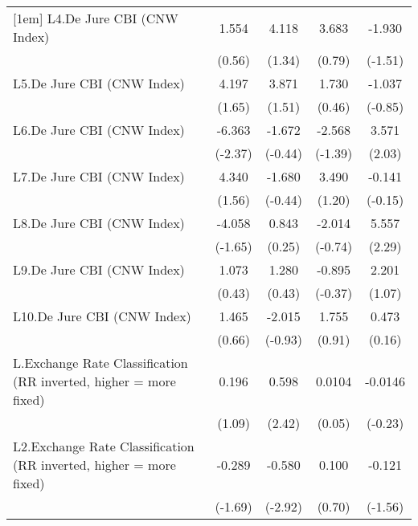 {\begin{longtable}{l*{4}{c}}
[1em]
L4.De Jure CBI (CNW Index)&    1.554         &    4.118         &    3.683         &   -1.930         \\
                &   (0.56)         &   (1.34)         &   (0.79)         &  (-1.51)         \\
[1em]
L5.De Jure CBI (CNW Index)&    4.197         &    3.871         &    1.730         &   -1.037         \\
                &   (1.65)         &   (1.51)         &   (0.46)         &  (-0.85)         \\
[1em]
L6.De Jure CBI (CNW Index)&   -6.363\sym{*}  &   -1.672         &   -2.568         &    3.571\sym{*}  \\
                &  (-2.37)         &  (-0.44)         &  (-1.39)         &   (2.03)         \\
[1em]
L7.De Jure CBI (CNW Index)&    4.340         &   -1.680         &    3.490         &   -0.141         \\
                &   (1.56)         &  (-0.44)         &   (1.20)         &  (-0.15)         \\
[1em]
L8.De Jure CBI (CNW Index)&   -4.058         &    0.843         &   -2.014         &    5.557\sym{*}  \\
                &  (-1.65)         &   (0.25)         &  (-0.74)         &   (2.29)         \\
[1em]
L9.De Jure CBI (CNW Index)&    1.073         &    1.280         &   -0.895         &    2.201         \\
                &   (0.43)         &   (0.43)         &  (-0.37)         &   (1.07)         \\
[1em]
L10.De Jure CBI (CNW Index)&    1.465         &   -2.015         &    1.755         &    0.473         \\
                &   (0.66)         &  (-0.93)         &   (0.91)         &   (0.16)         \\
[1em]
L.Exchange Rate Classification (RR inverted, higher = more fixed)&    0.196         &    0.598\sym{*}  &   0.0104         &  -0.0146         \\
                &   (1.09)         &   (2.42)         &   (0.05)         &  (-0.23)         \\
[1em]
L2.Exchange Rate Classification (RR inverted, higher = more fixed)&   -0.289         &   -0.580\sym{**} &    0.100         &   -0.121         \\
                &  (-1.69)         &  (-2.92)         &   (0.70)         &  (-1.56)         \\

\end{longtable}}
